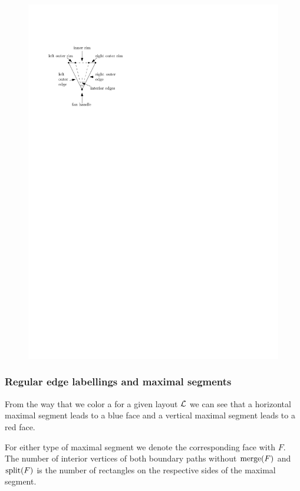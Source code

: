    \begin{figure}[h]
     \centering
     \includegraphics[scale=1]{rectangularDuals/img/fanterms}
     \caption{}
     \label{fig:rect:fanTerms}
   \end{figure}

  \subsubsection{Regular edge labellings and maximal segments}
    From the way that we color a \rel for a given layout $\mathcal{L}$ we can see that a horizontal maximal segment leads to a blue face and a vertical maximal segment leads to a red face.

    For either type of maximal segment we denote the corresponding face with $F$. The number of interior vertices of both boundary paths without $\operatorname{merge}(F)$ and $\operatorname{split}(F)$ is the number of rectangles on the respective sides of the maximal segment.


